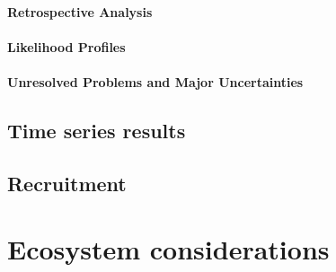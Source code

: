 \documentclass[11pt,
  english,
  a4paper,
]{article}
\begin{document}
\leavevmode\tagmcend\tagstructend


\hypertarget{retrospective-analysis}{%
\paragraph{Retrospective Analysis}\label{retrospective-analysis}}

\leavevmode\tagmcend\tagstructend


\hypertarget{likelihood-profiles}{%
\paragraph{Likelihood Profiles}\label{likelihood-profiles}}

\leavevmode\tagmcend\tagstructend


\hypertarget{unresolved-problems-and-major-uncertainties}{%
\paragraph{Unresolved Problems and Major Uncertainties}\label{unresolved-problems-and-major-uncertainties}}

\leavevmode\tagmcend\tagstructend


\hypertarget{time-series-results}{%
\subsection{Time series results}\label{time-series-results}}

\leavevmode\tagmcend\tagstructend


\hypertarget{recruitment}{%
\subsection{Recruitment}\label{recruitment}}

\leavevmode\tagmcend\tagstructend


\hypertarget{ecosystem-considerations}{%
\section{Ecosystem considerations}\label{ecosystem-considerations}}
\end{document}
